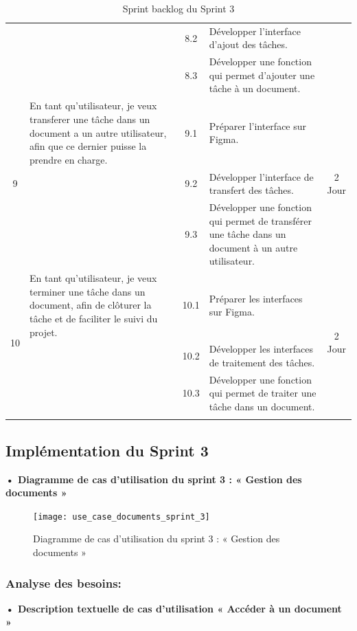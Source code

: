 \begin{adjustwidth}{-1cm}{}
\begin{longtable}{|c|p{6cm}|c|p{6cm}|c|}
      \cline{3-4}
      & & 8.2 & Développer l'interface d'ajout des tâches. & \\
      \cline{3-4}
      & & 8.3 & Développer une fonction qui permet d'ajouter une tâche à un document. & \\
      \cline{1-5}
      \multirow{3}{*}{9} & En tant qu'utilisateur, je veux transferer une tâche dans un document a un autre utilisateur, afin que ce dernier puisse la prendre en charge. & 9.1 & Préparer l'interface sur Figma. & \multirow{3}{*}{2 Jour} \\
      \cline{3-4}
      & & 9.2 & Développer l'interface de transfert des tâches. & \\
      \cline{3-4}
      & & 9.3 & Développer une fonction qui permet de transférer une tâche dans un document à un autre utilisateur. & \\
      \cline{1-5}
      \multirow{3}{*}{10} &En tant qu'utilisateur, je veux terminer une tâche dans un document, afin de clôturer la tâche et de faciliter le suivi du projet. & 10.1 & Préparer les interfaces sur Figma. & \multirow{3}{*}{2 Jour} \\
      \cline{3-4}
      & & 10.2 & Développer les interfaces de traitement des tâches. & \\
      \cline{3-4}
      & & 10.3 & Développer une fonction qui permet de traiter une tâche dans un document. & \\
      \cline{1-5}
  \hline
  \caption{Sprint backlog du Sprint 3}
  \label{tab:sprint-backlog-3}
\end{longtable}
\end{adjustwidth}



\subsection{Implémentation du Sprint 3}
\textbf{•	Diagramme de cas d'utilisation du sprint 3 : « Gestion des documents »}

\begin{figure}[H]
  \centering
  \texttt{[image: use\_case\_documents\_sprint\_3]}
  \caption{Diagramme de cas d'utilisation du sprint 3 : « Gestion des documents »}
  \label{fig:UseCaseDiagramSprint3}
\end{figure}


\subsubsection{Analyse des besoins:}
\textbf{•	Description textuelle de cas d'utilisation « Accéder à un document »}


